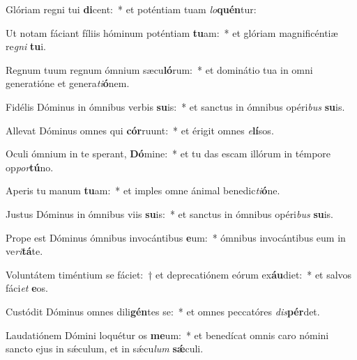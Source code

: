 \item Glóriam regni tui \textbf{di}cent:~* et poténtiam tuam \textit{lo}\textbf{quén}tur:
\item Ut notam fáciant fíliis hóminum poténtiam \textbf{tu}am:~* et glóriam magnificéntiæ re\textit{gni} \textbf{tu}i.
\item Regnum tuum regnum ómnium sæcu\textbf{ló}rum:~* et dominátio tua in omni generatióne et genera\textit{ti}\textbf{ó}nem.
\item Fidélis Dóminus in ómnibus verbis \textbf{su}is:~* et sanctus in ómnibus opéri\textit{bus} \textbf{su}is.
\item Allevat Dóminus omnes qui \textbf{cór}ruunt:~* et érigit omnes \textit{e}\textbf{lí}sos.
\item Oculi ómnium in te sperant, \textbf{Dó}mine:~* et tu das escam illórum in témpore op\textit{por}\textbf{tú}no.
\item Aperis tu manum \textbf{tu}am:~* et imples omne ánimal benedic\textit{ti}\textbf{ó}ne.
\item Justus Dóminus in ómnibus viis \textbf{su}is:~* et sanctus in ómnibus opéri\textit{bus} \textbf{su}is.
\item Prope est Dóminus ómnibus invocántibus \textbf{e}um:~* ómnibus invocántibus eum in ve\textit{ri}\textbf{tá}te.
\item Voluntátem timéntium se fáciet:~† et deprecatiónem eórum ex\textbf{áu}diet:~* et salvos fáci\textit{et} \textbf{e}os.
\item Custódit Dóminus omnes dili\textbf{gén}tes se:~* et omnes peccatóres \textit{dis}\textbf{pér}det.
\item Laudatiónem Dómini loquétur os \textbf{me}um:~* et benedícat omnis caro nómini sancto ejus in sǽculum, et in sǽcu\textit{lum} \textbf{sǽ}culi.
